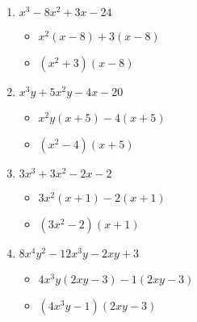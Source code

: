 \begin{enumerate}
\begin{itemize}
  \end{itemize}
\item $x^{3} - 8x^{2} + 3x - 24$
  \begin{itemize}
  \item $x^{2}(x-8)+3(x-8)$
  \item $(x^{2}+3)(x-8)$
  \end{itemize}
\item $x^{3}y + 5x^{2}y - 4x - 20$
  \begin{itemize}
  \item $x^{2}y(x+5)-4(x+5)$
  \item $(x^{2}-4)(x+5)$
  \end{itemize}
\item $3x^{3} + 3x^{2} - 2x - 2$
  \begin{itemize}
  \item $3x^{2}(x+1)-2(x+1)$
  \item $(3x^{2}-2)(x+1)$
  \end{itemize}
\item $8x^{4}y^{2} - 12x^{3}y - 2xy + 3$
  \begin{itemize}
  \item $4x^{3}y(2xy-3)-1(2xy-3)$
  \item $(4x^{3}y-1)(2xy-3)$
  \end{itemize}
\end{enumerate}
